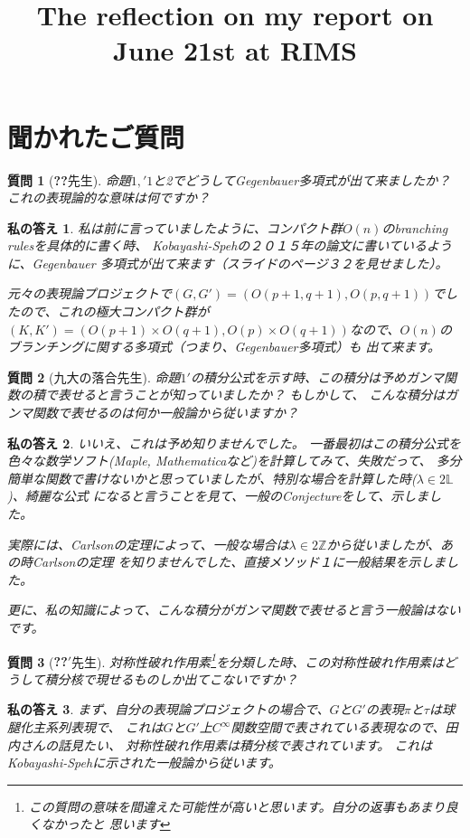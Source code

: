 \documentclass[12pt]{article} %
\title{The reflection on my report on June 21st at RIMS}
\author{}
\newtheorem{question}{質問}
\newtheorem{answer}{私の答え}
\begin{document}
\maketitle
\section{聞かれたご質問}
\begin{question}[\textbf{??}先生]
	命題$1,'1$と2でどうしてGegenbauer多項式が出て来ましたか？
	これの表現論的な意味は何ですか？
\end{question}
\begin{answer}
私は前に言っていましたように、コンパクト群$O(n)$のbranching rulesを具体的に書く時、
Kobayashi-Spehの２０１５年の論文に書いているように、Gegenbauer 多項式が出て来ます{\footnotesize （スライドのページ３２を見せました）}。

元々の表現論プロジェクトで$(G,G')=(O(p+1,q+1),O(p,q+1))$でしたので、これの極大コンパクト群が
$(K,K')=(O(p+1)\times O(q+1),O(p)\times O(q+1))$なので、$O(n)$のブランチングに関する多項式（つまり、Gegenbauer多項式）も
出て来ます。
\end{answer}
\begin{question}[九大の落合先生]
	命題$1'$の積分公式を示す時、この積分は予めガンマ関数の積で表せると言うことが知っていましたか？
	もしかして、
	こんな積分はガンマ関数で表せるのは何か一般論から従いますか？
\end{question}
\begin{answer}
いいえ、これは予め知りませんでした。
一番最初はこの積分公式を色々な数学ソフト(Maple, Mathematicaなど)を計算してみて、失敗だって、
多分簡単な関数で書けないかと思っていましたが、特別な場合を計算した時($\lambda\in2\mathbb{L}$)、綺麗な公式
になると言うことを見て、一般のConjectureをして、示しました。

実際には、Carlsonの定理によって、一般な場合は$\lambda\in 2\mathbb{Z}$から従いましたが、あの時Carlsonの定理
を知りませんでした、直接メソッド１に一般結果を示しました。

更に、私の知識によって、こんな積分がガンマ関数で表せると言う一般論はないです。
\end{answer}
\begin{question}[\textbf{??$'$}先生]
	対称性破れ作用素\footnote{この質問の意味を間違えた可能性が高いと思います。自分の返事もあまり良くなかったと
	思います}を分類した時、この対称性破れ作用素はどうして積分核で現せるものしか出てこないですか？
\end{question}
\begin{answer}
	まず、自分の表現論プロジェクトの場合で、$G$と$G'$の表現$\pi$と$\tau$は球腿化主系列表現で、
	これは$G$と$G'$上$C^\infty$関数空間で表されている表現なので、田内さんの話見たい、
	対称性破れ作用素は積分核で表されています。
	これはKobayashi-Spehに示された一般論から従います。
\end{answer}
\end{document}
